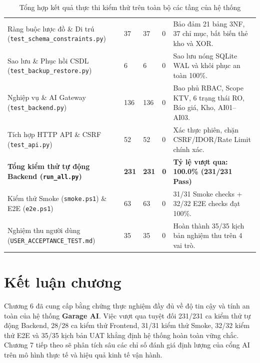 \begin{table}[H]
\centering
\small
\caption{Tổng hợp kết quả thực thi kiểm thử trên toàn bộ các tầng của hệ thống}
\label{tab:g-test-summary}
\begin{tabularx}{\textwidth}{|L{4.8cm}|C{1.4cm}|C{1.4cm}|C{1.4cm}|Y|}
\hline
{} &  &  &  & \\
\hline
Ràng buộc lược đồ \& Di trú (\texttt{test\_schema\_constraints.py}) & 37 & 37 & 0 & Bảo đảm 21 bảng 3NF, 37 chỉ mục, bất biến thẻ kho và XOR.\\
\hline
Sao lưu \& Phục hồi CSDL (\texttt{test\_backup\_restore.py}) & 6 & 6 & 0 & Sao lưu nóng SQLite WAL và khôi phục an toàn 100\%.\\
\hline
Nghiệp vụ \& AI Gateway (\texttt{test\_backend.py}) & 136 & 136 & 0 & Bao phủ RBAC, Scope KTV, 6 trạng thái RO, Báo giá, Kho, AI01--AI03.\\
\hline
Tích hợp HTTP API \& CSRF (\texttt{test\_api.py}) & 52 & 52 & 0 & Xác thực phiên, chặn CSRF/IDOR/Rate Limit chính xác.\\
\hline
\textbf{Tổng kiểm thử tự động Backend (\texttt{run\_all.py})} & \textbf{231} & \textbf{231} & \textbf{0} & \textbf{Tỷ lệ vượt qua: 100.0\% (231/231 Pass)}\\
\hline
Kiểm thử Smoke (\texttt{smoke.ps1}) \& E2E (\texttt{e2e.ps1}) & 63 & 63 & 0 & 31/31 Smoke checks + 32/32 E2E checks đạt 100\%.\\
\hline
Nghiệm thu người dùng (\texttt{USER\_ACCEPTANCE\_TEST.md}) & 35 & 35 & 0 & Hoàn thành 35/35 kịch bản nghiệm thu trên 4 vai trò.\\
\hline
\end{tabularx}
\end{table}

\section{Kết luận chương}

Chương 6 đã cung cấp bằng chứng thực nghiệm đầy đủ về độ tin cậy và tính an toàn của hệ thống \textbf{Garage AI}. Việc vượt qua tuyệt đối 231/231 ca kiểm thử tự động Backend, 28/28 ca kiểm thử Frontend, 31/31 kiểm thử Smoke, 32/32 kiểm thử E2E và 35/35 kịch bản UAT khẳng định hệ thống hoàn toàn vững chắc. Chương 7 tiếp theo sẽ phân tích sâu các chỉ số đánh giá định lượng của cổng AI trên mô hình thực tế và hiệu quả kinh tế vận hành.
